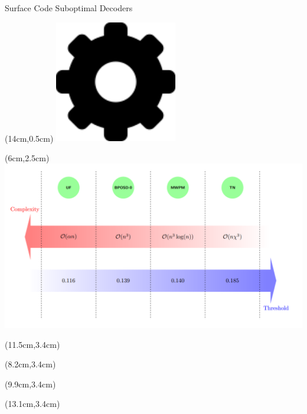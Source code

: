 \documentclass{dfki}
\begin{document}
\begin{frame}{Surface Code Suboptimal Decoders}
	\begin{textblock*}{2cm}(14cm,0.5cm)
		\includegraphics[width=0.4\textwidth]{fig/decoder.png}
	\end{textblock*}
	\begin{textblock*}{9cm}(6cm,2.5cm)
        \includegraphics[width=1\textwidth]{fig/Screenshot from 2025-03-24 15-21-55.png}
    \end{textblock*}
	\begin{textblock*}{2cm}(11.5cm,3.4cm)
		\begin{tiny}
			\cite{edmonds_paths_1965}
		\end{tiny}
	\end{textblock*}
	\begin{textblock*}{2cm}(8.2cm,3.4cm)
		\begin{tiny}
			\cite{delfosse_almost-linear_2021}
		\end{tiny}
	\end{textblock*}
	\begin{textblock*}{2cm}(9.9cm,3.4cm)
		\begin{tiny}
			\cite{panteleev_degenerate_2021}
		\end{tiny}
	\end{textblock*}
	\begin{textblock*}{2cm}(13.1cm,3.4cm)

\end{textblock*}
\end{frame}
\end{document}
